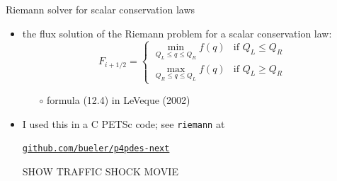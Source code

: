 \documentclass[10pt,dvipsnames,usepdftitle=false,
hyperref={pdftitle = {Finite volume methods},
    pdfauthor = {Ed Bueler}}]{beamer}
\begin{document}
\begin{frame}{Riemann solver for scalar conservation laws}

\begin{itemize}
\item the flux solution of the Riemann problem for a scalar conservation law:
    $$F_{i+1/2} = \begin{cases} {\displaystyle \min_{Q_L \le q \le Q_R} f(q)} & \text{if } Q_L \le Q_R \\ {\displaystyle \max_{Q_R \le q \le Q_L} f(q)} & \text{if } Q_L \ge Q_R \end{cases}$$

    \begin{itemize}
    \item[$\circ$] formula (12.4) in LeVeque (2002)
    \end{itemize}
\item I used this in a C PETSc code; see \texttt{riemann} at
\begin{center}
\href{https://github.com/bueler/p4pdes-next}{\texttt{github.com/bueler/p4pdes-next}}
\end{center}

\vspace{10mm}
\begin{center}
\alert{SHOW TRAFFIC SHOCK MOVIE}
\end{center}
\end{itemize}

\end{frame}
\end{document}
